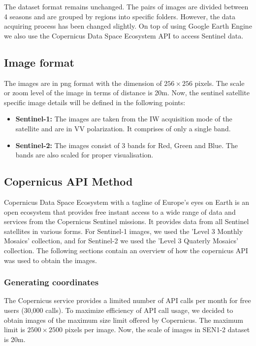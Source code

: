 The dataset format remains unchanged. The pairs of images are divided between 4 seasons and are grouped by regions into specific folders. However, the data acquiring process has been changed slightly. On top of using Google Earth Engine\cite{GORELICK201718} we also use the Copernicus Data Space Ecosystem API to access Sentinel data.

\subsection{Image format}
The images are in png format with the dimension of $256\times256$ pixels. The scale or zoom level of the image in terms of distance is 20m. Now, the sentinel satellite specific image details will be defined in the following points:
\begin{itemize}
    \item \textbf{Sentinel-1:} The images are taken from the IW acquisition mode of the satellite and are in VV polarization. It comprises of only a single band.
    \item \textbf{Sentinel-2:} The images consist of 3 bands for Red, Green and Blue. The bands are also scaled for proper visualisation.
\end{itemize}

\subsection{Copernicus API Method}
Copernicus Data Space Ecosystem with a tagline of Europe's eyes on Earth is an open ecosystem that provides free instant access to a wide range of data and services from the Copernicus Sentinel missions\cite{copernicusHome}. It provides data from all Sentinel satellites in various forms. For Sentinel-1 images, we used the 'Level 3 Monthly Mosaics' collection, and for Sentinel-2 we used the 'Level 3 Quaterly Mosaics' collection.
The following sections contain an overview of how the copernicus API was used to obtain the images.

\subsubsection{Generating coordinates}
The Copernicus service provides a limited number of API calls per month for free users (30,000 calls). To maximize efficiency of API call usage, we decided to obtain images of the maximum size limit offered by Copernicus. The maximum limit is $2500\times2500$ pixels per image. Now, the scale of images in SEN1-2 dataset is 20m.

